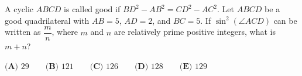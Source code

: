 A cyclic $ABCD$ is called good if $BD^2 - AB^2 = CD^2 - AC^2$. Let $ABCD$ be a good quadrilateral with $AB = 5$, $AD = 2$, and $BC = 5$. If $\sin^2(\angle ACD)$ can be written as $\dfrac{m}{n}$, where $m$ and $n$ are relatively prime positive integers, what is $m + n$?

$\textbf{(A) } 29 \qquad\textbf{(B) } 121 \qquad\textbf{(C) } 126 \qquad\textbf{(D) } 128 \qquad\textbf{(E) } 129$
